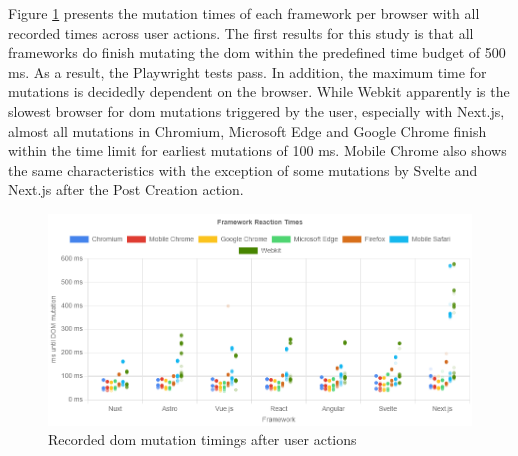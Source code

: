 \documentclass[a4paper, 12pt]{article}
\begin{document}
Figure \ref{fig:playwrightResults:total} presents the mutation times of each framework per browser with all recorded times across user actions.
The first results for this study is that all frameworks do finish mutating the \acrshort{dom} within the predefined time budget of 500 ms.
As a result, the Playwright tests pass.
In addition, the maximum time for mutations is decidedly dependent on the browser.
While Webkit apparently is the slowest browser for \acrshort{dom} mutations triggered by the user, especially with Next.js, almost all mutations in Chromium, Microsoft Edge and Google Chrome finish within the time limit for earliest mutations of 100 ms.
Mobile Chrome also shows the same characteristics with the exception of some mutations by Svelte and Next.js after the Post Creation action.

\begin{figure}[ht]
  \centering
  \includegraphics[width=\linewidth, keepaspectratio]{img/playwright-results/userActions_byUserAction/total.png}
  \caption{Recorded \acrshort{dom} mutation timings after user actions}
  \label{fig:playwrightResults:total}
\end{figure}
\end{document}
